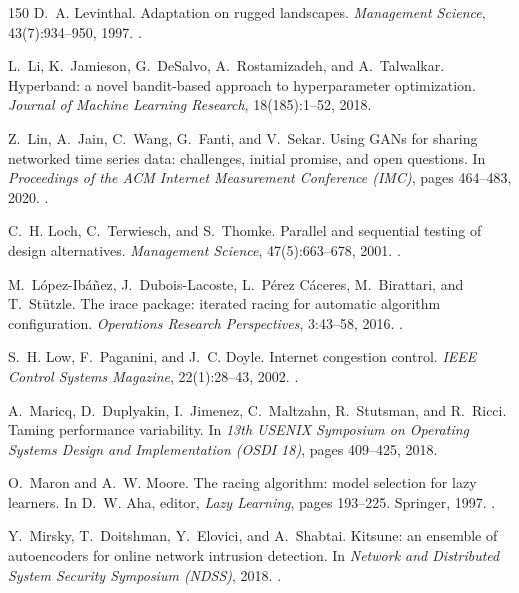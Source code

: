 \begin{thebibliography}{150}
D.~A. Levinthal. Adaptation on rugged landscapes. \emph{Management Science}, 43(7):934--950, 1997. .

L.~Li, K.~Jamieson, G.~DeSalvo, A.~Rostamizadeh, and A.~Talwalkar. Hyperband: a novel bandit-based approach to hyperparameter optimization. \emph{Journal of Machine Learning Research}, 18(185):1--52, 2018.

Z.~Lin, A.~Jain, C.~Wang, G.~Fanti, and V.~Sekar. Using GANs for sharing networked time series data: challenges, initial promise, and open questions. In \emph{Proceedings of the ACM Internet Measurement Conference (IMC)}, pages 464--483, 2020. .

C.~H. Loch, C.~Terwiesch, and S.~Thomke. Parallel and sequential testing of design alternatives. \emph{Management Science}, 47(5):663--678, 2001. .

M.~L{\'o}pez-Ib{\'a}{\~n}ez, J.~Dubois-Lacoste, L.~P{\'e}rez C{\'a}ceres, M.~Birattari, and T.~St{\"u}tzle. The irace package: iterated racing for automatic algorithm configuration. \emph{Operations Research Perspectives}, 3:43--58, 2016. .

S.~H. Low, F.~Paganini, and J.~C. Doyle. Internet congestion control. \emph{IEEE Control Systems Magazine}, 22(1):28--43, 2002. .

A.~Maricq, D.~Duplyakin, I.~Jimenez, C.~Maltzahn, R.~Stutsman, and R.~Ricci. Taming performance variability. In \emph{13th USENIX Symposium on Operating Systems Design and Implementation (OSDI 18)}, pages 409--425, 2018.

O.~Maron and A.~W. Moore. The racing algorithm: model selection for lazy learners. In D.~W. Aha, editor, \emph{Lazy Learning}, pages 193--225. Springer, 1997. .

Y.~Mirsky, T.~Doitshman, Y.~Elovici, and A.~Shabtai. Kitsune: an ensemble of autoencoders for online network intrusion detection. In \emph{Network and Distributed System Security Symposium (NDSS)}, 2018. .


\end{thebibliography}
